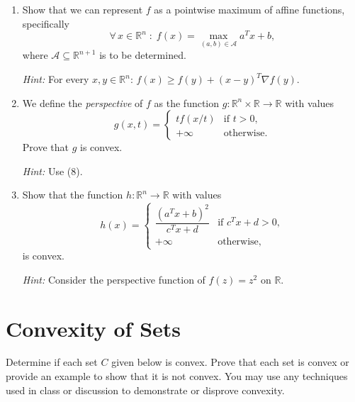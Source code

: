 \documentclass[10pt]{article}
\theoremstyle{definition}
\theoremstyle{plain}
\newcommand{\RR}{\mathbb{R}}
\begin{document}
\begin{enumerate}[label=(\alph*)]
    \item Show that we can represent $f$ as a pointwise maximum of affine functions, specifically
    \begin{equation}
        \forall\, x \in \RR^n \;:\; f(x) = \max_{(a,b) \in \mathcal{A}} a^T x + b,
    \end{equation}
    where $\mathcal{A} \subseteq \RR^{n+1}$ is to be determined.

    \emph{Hint:} For every $x, y \in \RR^n$: $f(x) \ge f(y) + (x - y)^T \nabla f(y)$.

    \item We define the \emph{perspective} of $f$ as the function $g : \RR^n \times \RR \to \RR$ with values
    \[
        g(x, t) = \begin{cases} tf(x/t) & \text{if } t > 0, \\ +\infty & \text{otherwise.} \end{cases}
    \]
    Prove that $g$ is convex.

    \emph{Hint:} Use (8).

    \item Show that the function $h : \RR^n \to \RR$ with values
    \[
        h(x) = \begin{cases} \dfrac{(a^T x + b)^2}{c^T x + d} & \text{if } c^T x + d > 0, \\[6pt] +\infty & \text{otherwise,} \end{cases}
    \]
    is convex.

    \emph{Hint:} Consider the perspective function of $f(z) = z^2$ on $\RR$.
\end{enumerate}

\section{Convexity of Sets}

Determine if each set $C$ given below is convex. Prove that each set is convex or provide an example to show that it is not convex. You may use any techniques used in class or discussion to demonstrate or disprove convexity.
\end{document}

